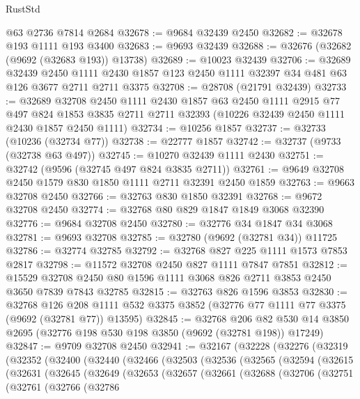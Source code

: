 \begin{lexlean}{RustStd}
\begin{coremodule}
{\begin{coremodule}
{{{{{{{{{{{{{{{{{{{{{{{{{{{{{{{{{{{{{{{{{{{{{{{{{{{{{{{    @63
    @2736
    @7814
    @2684
@32678 := @9684 @32439 @2450
@32682 := @32678 @193 @1111 @193 @3400
@32683 := @9693 @32439
@32688 := @32676 (@32682 (@9692 (@32683 @193)) @13738)
@32689 := @10023 @32439
@32706 := @32689
    @32439
    @2450
    @1111
    @2430
    @1857
    @123
    @2450
    @1111
    @32397
    @34
    @481
    @63
    @126
    @3677
    @2711
    @2711
    @3375
@32708 := @28708 (@21791 @32439)
@32733 := @32689
    @32708
    @2450
    @1111
    @2430
    @1857
    @63
    @2450
    @1111
    @2915
    @77
    @497
    @824
    @1853
    @3835
    @2711
    @2711
    @32393
    (@10226 @32439 @2450 @1111 @2430 @1857 @2450 @1111)
@32734 := @10256 @1857
@32737 := @32733 (@10236 (@32734 @77))
@32738 := @22777 @1857
@32742 := @32737 (@9733 (@32738 @63 @497))
@32745 := @10270 @32439 @1111 @2430
@32751 := @32742 (@9596 (@32745 @497 @824 @3835 @2711))
@32761 := @9649 @32708 @2450 @1579 @830 @1850 @1111 @2711 @32391 @2450 @1859
@32763 := @9663 @32708 @2450
@32766 := @32763 @830 @1850 @32391
@32768 := @9672 @32708 @2450
@32774 := @32768 @80 @829 @1847 @1849 @3068 @32390
@32776 := @9684 @32708 @2450
@32780 := @32776 @34 @1847 @34 @3068
@32781 := @9693 @32708
@32785 := @32780 (@9692 (@32781 @34)) @11725
@32786 := @32774 @32785
@32792 := @32768 @827 @225 @1111 @1573 @7853 @2817
@32798 := @11572 @32708 @2450 @827 @1111 @7847 @7851
@32812 := @15529 @32708 @2450 @80 @1596 @1111 @3068 @826 @2711 @3853 @2450 @3650 @7839 @7843 @32785
@32815 := @32763 @826 @1596 @3853
@32830 := @32768
    @126
    @208
    @1111
    @532
    @3375
    @3852
    (@32776 @77 @1111 @77 @3375 (@9692 (@32781 @77)) @13595)
@32845 := @32768
    @206
    @82
    @530
    @14
    @3850
    @2695
    (@32776 @198 @530 @198 @3850 (@9692 (@32781 @198)) @17249)
@32847 := @9709 @32708 @2450
@32941 := @32167
    (@32228
      (@32276
        (@32319
          (@32352
            (@32400
              (@32440
                (@32466
                  (@32503
                    (@32536
                      (@32565
                        (@32594
                          (@32615
                            (@32631
                              (@32645
                                (@32649
                                  (@32653
                                    (@32657
                                      (@32661
                                        (@32688
                                          (@32706
                                            (@32751
                                              (@32761
                                                (@32766
                                                  (@32786
}}}}}}}}}}}}}}}}}}}}}}}}}}}}}}}}}}}}}}}}}}}}}}}}}}}}}}}
\end{coremodule}}
\end{coremodule}
\end{lexlean}
